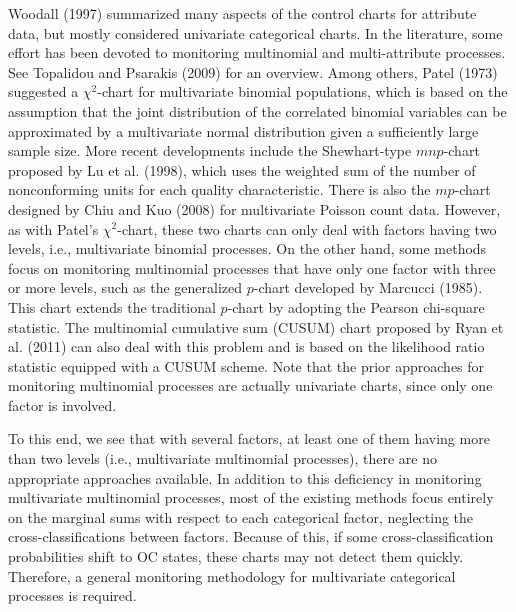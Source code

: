 Woodall (1997) summarized many aspects of the control charts for attribute data, but
mostly considered univariate categorical charts. In the literature, some effort has
been devoted to monitoring multinomial and multi-attribute processes. See Topalidou
and Psarakis (2009) for an overview. Among others, Patel (1973) suggested a
$\chi^2$-chart for multivariate binomial populations, which is based on the
assumption that the joint distribution of the correlated binomial variables can be
approximated by a multivariate normal distribution given a sufficiently large sample
size. More recent developments include the Shewhart-type $mnp$-chart proposed by Lu
et al. (1998), which uses the weighted sum of the number of nonconforming units for
each quality characteristic. There is also the $mp$-chart designed by Chiu and Kuo
(2008) for multivariate Poisson count data. However, as with Patel's $\chi^2$-chart,
these two charts can only deal with factors having two levels, i.e., multivariate
binomial processes. On the other hand, some methods focus on monitoring multinomial
processes that have only one factor with three or more levels, such as the
generalized $p$-chart developed by Marcucci (1985). This chart extends the
traditional $p$-chart by adopting the Pearson chi-square statistic. The multinomial
cumulative sum (CUSUM) chart proposed by Ryan et al. (2011) can also deal with this
problem and is based on the likelihood ratio statistic equipped with a CUSUM scheme.
Note that the prior approaches for monitoring multinomial processes are actually
univariate charts, since only one factor is involved.

To this end, we see that with several factors, at least one of them having more than
two levels (i.e., multivariate multinomial processes), there are no appropriate
approaches available. In addition to this deficiency in monitoring multivariate
multinomial processes, most of the existing methods focus entirely on the marginal
sums with respect to each categorical factor, neglecting the cross-classifications
between factors. Because of this, if some cross-classification probabilities shift
to OC states, these charts may not detect them quickly. Therefore, a general
monitoring methodology for multivariate categorical processes is required.

